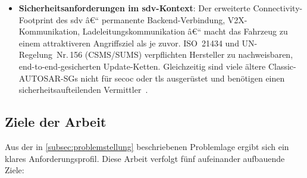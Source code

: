 ﻿\documentclass[12pt,a4paper,twoside]{article}
\begin{document}
\begin{itemize}[leftmargin=*]
  \item \textbf{Sicherheitsanforderungen im \gls{sdv}-Kontext}:
    Der erweiterte Connectivity-Footprint des \gls{sdv} â€“ permanente
    Backend-Verbindung, V2X-Kommunikation, Ladeleitungskommunikation â€“ macht
    das Fahrzeug zu einem attraktiveren Angriffsziel als je zuvor.
    ISO~21434 und UN-Regelung~Nr.\,156 (CSMS/SUMS) verpflichten
    Hersteller zu nachweisbaren, end-to-end-gesicherten Update-Ketten.
    Gleichzeitig sind viele ältere Classic-AUTOSAR-SGs nicht für
    \gls{secoc} oder \gls{tls} ausgerüstet und benötigen einen
    sicherheitsaufteilenden Vermittler~\cite{zelle2020security}.
\end{itemize}

\subsection{Ziele der Arbeit}
\label{subsec:ziele}

Aus der in \cref{subsec:problemstellung} beschriebenen Problemlage
ergibt sich ein klares Anforderungsprofil. Diese Arbeit verfolgt
fünf aufeinander aufbauende Ziele:
\end{document}

